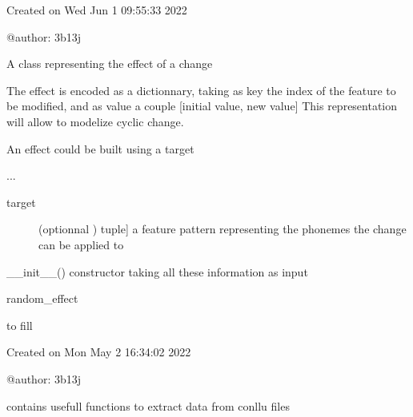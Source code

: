 \documentclass[letterpaper,10pt,english]{sphinxmanual}
\begin{document}
\label{\detokenize{index:module-Effect}}
\sphinxAtStartPar
Created on Wed Jun  1 09:55:33 2022

\sphinxAtStartPar
@author: 3b13j

\begin{fulllineitems}
\label{\detokenize{index:Effect.Effect}}
\sphinxAtStartPar
A class representing the effect of a change

\sphinxAtStartPar
The effect is encoded as a dictionnary, taking as key the index of the feature to be modified, and
as value a couple {[}initial value, new value{]}
This representation will allow to modelize cyclic change.

\sphinxAtStartPar
An effect could be built using a target

\sphinxAtStartPar
...
\begin{description}
\item[{target}] \leavevmode{[}(optionnal ) tuple{]}
\sphinxAtStartPar
a feature pattern representing the phonemes the change can be applied to

\end{description}

\sphinxAtStartPar
\_\_init\_\_() constructor taking all these information as input

\sphinxAtStartPar
random\_effect

\end{fulllineitems}

\label{\detokenize{index:module-Generator}}
\sphinxAtStartPar
to fill

\label{\detokenize{index:module-conllu_utilities}}
\sphinxAtStartPar
Created on Mon May  2 16:34:02 2022

\sphinxAtStartPar
@author: 3b13j

\sphinxAtStartPar
contains usefull functions to extract data from conllu files
\end{document}
